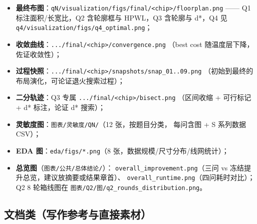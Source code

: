 \documentclass[12pt,a4paper]{article}
\begin{document}
\begin{itemize}
    \item \textbf{最终布图}：\texttt{qN/visualization/\allowbreak figs/final/\allowbreak<chip>/\allowbreak floorplan.png}
    —— Q1 标注面积/长宽比，Q2 含轮廓框与 HPWL，Q3 含轮廓与 d*，Q4 见
    \texttt{q4/visualization/\allowbreak figs/\allowbreak q4\_optimal.png}；
    \item \textbf{收敛曲线}：\texttt{.../final/\allowbreak<chip>/\allowbreak convergence.png}
    （best cost 随温度层下降，佐证收敛性）；
    \item \textbf{过程快照}：\texttt{.../final/\allowbreak<chip>/\allowbreak snapshots/\allowbreak snap\_01..09.png}
    （初始到最终的布局演化，可论证退火搜索过程）；
    \item \textbf{二分轨迹}：Q3 专属 \texttt{.../final/\allowbreak<chip>/\allowbreak bisect.png}
    （区间收缩 + 可行标记 + d* 标注，论证 d* 搜索）；
    \item \textbf{灵敏度图}：\texttt{图表/灵敏度/QN/}（12 张，按题目分类，
    每问含图 + S 系列数据 CSV）；
    \item \textbf{EDA 图}：\texttt{eda/figs/*.png}（8 张，数据规模/尺寸分布/线网统计）；
    \item \textbf{总览图}（\texttt{图表/公共/总体结论/}）：
    \texttt{overall\_improvement.png}（三问 vs 冻结提升总览，建议放摘要或结果章首）、
    \texttt{overall\_runtime.png}（四问耗时对比）；Q2 8 轮箱线图在
    \texttt{图表/Q2/图/q2\_rounds\_distribution.png}。
\end{itemize}

\subsection{文档类（写作参考与直接素材）}
\end{document}
